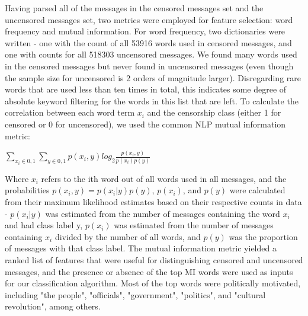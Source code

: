 \documentclass{article} %
\begin{document}
\begin{CJK*}{UTF8}{gbsn}
Having parsed all of the messages in the censored messages set and the uncensored messages set, two metrics were employed for feature selection: word frequency and mutual information. For word frequency, two dictionaries were written - one with the count of all 53916 words used in censored messages, and one with counts for all 518303 uncensored messages. We found many words used in the censored messages but never found in uncensored messages (even though the sample size for uncensored is 2 orders of magnitude larger). Disregarding rare words that are used less than ten times in total, this indicates some degree of absolute keyword filtering for the words in this list that are left. To calculate the correlation between each word term $x_{i}$ and the censorship class (either 1 for censored or 0 for uncensored), we used the common NLP mutual information metric:

\begin{center}
$\sum_{x_{i}\in{0,1}}\sum_{y\in{0,1}}p(x_{i},y)log_{2}\frac{p(x_{i},y)}{p(x_{i})p(y)}$
\end{center}

Where $x_{i}$ refers to the ith word out of all words used in all messages, and the probabilities $p(x_{i},y) = p(x_{i}|y)p(y)$, $p(x_{i})$, and $p(y)$ were calculated from their maximum likelihood estimates based on their respective counts in data - $p(x_{i}|y)$ was estimated from the number of messages containing the word $x_{i}$ and had class label y, $p(x_{i})$ was estimated from the number of messages containing $x_{i}$ divided by the number of all words, and $p(y)$ was the proportion of messages with that class label.  The mutual information metric yielded a ranked list of features that were useful for distinguishing censored and uncensored messages, and the presence or absence of the top MI words were used as inputs for our classification algorithm. Most of the top words were politically motivated, including "the people", "officials", "government", "politics", and "cultural revolution", among others.


\end{CJK*}
\end{document}
